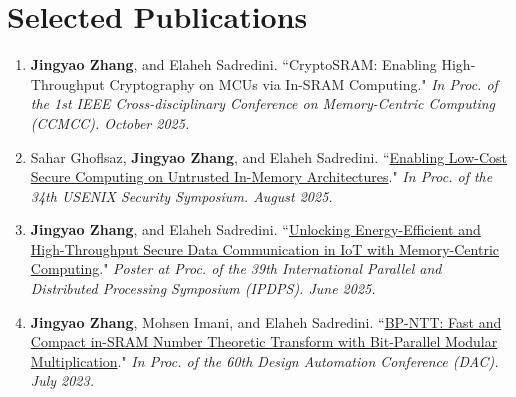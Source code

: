 \documentclass[letterpaper,11pt]{article}
\newcommand{\resumeSubHeadingListEnd}{\end{itemize}}
\begin{document}


\section{Selected Publications}
  \vspace{2pt}
   \begin{enumerate}[leftmargin=*, labelindent=12pt, label=\arabic*., topsep=0pt, partopsep=0pt, parsep=0pt, itemsep=3pt]
    \small
        
                        

        \item \textbf{Jingyao Zhang}, and Elaheh Sadredini. ``CryptoSRAM: Enabling High-Throughput Cryptography on MCUs via In-SRAM Computing." 
        \textit{In Proc. of the 1st IEEE Cross-disciplinary Conference on Memory-Centric Computing (CCMCC). October 2025.} 

        \item Sahar Ghoflsaz, \textbf{Jingyao Zhang}, and Elaheh Sadredini. ``\href{https://arxiv.org/abs/2501.17292}{Enabling Low-Cost Secure Computing on Untrusted In-Memory Architectures}." \textit{In Proc. of the 34th USENIX Security Symposium. August 2025.} 
    
        \item \textbf{Jingyao Zhang}, and Elaheh Sadredini. ``\href{https://ieeexplore.ieee.org/document/11105798}{Unlocking Energy-Efficient and High-Throughput Secure Data Communication in IoT with Memory-Centric Computing}." 
        \textit{Poster at Proc. of the 39th International Parallel and Distributed Processing Symposium (IPDPS). June 2025.} 
        
        \item \textbf{Jingyao Zhang}, Mohsen Imani, and Elaheh Sadredini. ``\href{https://arxiv.org/pdf/2303.00173.pdf}{BP-NTT: Fast and Compact in-SRAM Number Theoretic Transform with Bit-Parallel Modular Multiplication}." \textit{In Proc. of the 60th Design Automation Conference (DAC). July 2023.} 
        

\end{enumerate}
\end{document}
